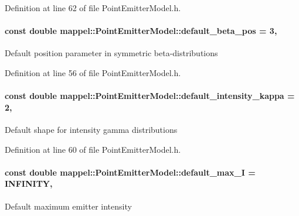 Definition at line 62 of file Point\+Emitter\+Model.\+h.

\paragraph[{\texorpdfstring{default\+\_\+beta\+\_\+pos}{default_beta_pos}}]{\setlength{\rightskip}{0pt plus 5cm}const double mappel\+::\+Point\+Emitter\+Model\+::default\+\_\+beta\+\_\+pos = 3\hspace{0.3cm}{\ttfamily [static]}, {\ttfamily [inherited]}}\hypertarget{classmappel_1_1PointEmitterModel_a9b64c3b4b97ac2805340c0779c71398c}{}\label{classmappel_1_1PointEmitterModel_a9b64c3b4b97ac2805340c0779c71398c}
Default position parameter in symmetric beta-\/distributions 

Definition at line 56 of file Point\+Emitter\+Model.\+h.

\paragraph[{\texorpdfstring{default\+\_\+intensity\+\_\+kappa}{default_intensity_kappa}}]{\setlength{\rightskip}{0pt plus 5cm}const double mappel\+::\+Point\+Emitter\+Model\+::default\+\_\+intensity\+\_\+kappa = 2\hspace{0.3cm}{\ttfamily [static]}, {\ttfamily [inherited]}}\hypertarget{classmappel_1_1PointEmitterModel_ad1f21ed3be543deed3c78a0494cb2984}{}\label{classmappel_1_1PointEmitterModel_ad1f21ed3be543deed3c78a0494cb2984}
Default shape for intensity gamma distributions 

Definition at line 60 of file Point\+Emitter\+Model.\+h.

\paragraph[{\texorpdfstring{default\+\_\+max\+\_\+I}{default_max_I}}]{\setlength{\rightskip}{0pt plus 5cm}const double mappel\+::\+Point\+Emitter\+Model\+::default\+\_\+max\+\_\+I = I\+N\+F\+I\+N\+I\+TY\hspace{0.3cm}{\ttfamily [static]}, {\ttfamily [inherited]}}\hypertarget{classmappel_1_1PointEmitterModel_acca80757a9a285a9e6eedea167d038c7}{}\label{classmappel_1_1PointEmitterModel_acca80757a9a285a9e6eedea167d038c7}
Default maximum emitter intensity 

